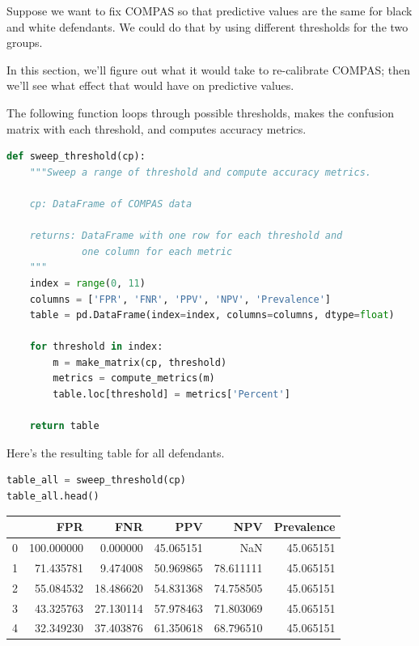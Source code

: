 Suppose we want to fix COMPAS so that predictive values are the same for
black and white defendants. We could do that by using different
thresholds for the two groups.

In this section, we'll figure out what it would take to re-calibrate
COMPAS; then we'll see what effect that would have on predictive values.

The following function loops through possible thresholds, makes the
confusion matrix with each threshold, and computes accuracy metrics.

\begin{lstlisting}[language=Python,style=source]
def sweep_threshold(cp):
    """Sweep a range of threshold and compute accuracy metrics.
    
    cp: DataFrame of COMPAS data
    
    returns: DataFrame with one row for each threshold and
             one column for each metric
    """
    index = range(0, 11)
    columns = ['FPR', 'FNR', 'PPV', 'NPV', 'Prevalence']
    table = pd.DataFrame(index=index, columns=columns, dtype=float) 

    for threshold in index:
        m = make_matrix(cp, threshold)
        metrics = compute_metrics(m)
        table.loc[threshold] = metrics['Percent']
        
    return table
\end{lstlisting}

Here's the resulting table for all defendants.

\begin{lstlisting}[language=Python,style=source]
table_all = sweep_threshold(cp)
table_all.head()
\end{lstlisting}

\begin{tabular}{lrrrrr}
\toprule
{} &         FPR &        FNR &        PPV &        NPV &  Prevalence \\
\midrule
0 &  100.000000 &   0.000000 &  45.065151 &        NaN &   45.065151 \\
1 &   71.435781 &   9.474008 &  50.969865 &  78.611111 &   45.065151 \\
2 &   55.084532 &  18.486620 &  54.831368 &  74.758505 &   45.065151 \\
3 &   43.325763 &  27.130114 &  57.978463 &  71.803069 &   45.065151 \\
4 &   32.349230 &  37.403876 &  61.350618 &  68.796510 &   45.065151 \\
\bottomrule
\end{tabular}

